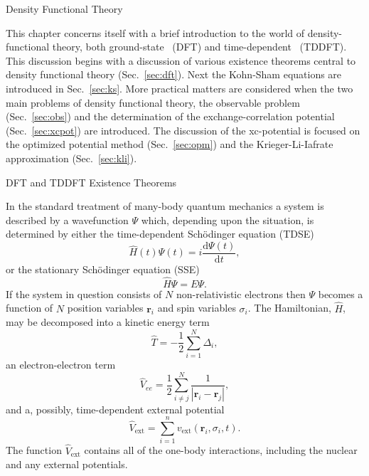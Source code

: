 \documentclass[letterpaper, 11 pt]{report}
\begin{document}
\begin{chapter}{Density Functional Theory \label{chap:dft}}

   This chapter concerns itself with a brief introduction to the world of density-functional theory,
   both ground-state~\cite{dft-engel} (DFT) and time-dependent~\cite{tddft, marques-1} (TDDFT). This
   discussion begins with a discussion of various existence theorems central to density functional
   theory (Sec.~\ref{sec:dft}). Next the Kohn-Sham equations are introduced in Sec.~\ref{sec:ks}.
   More practical matters are considered when the two main problems of density functional theory,
   the observable problem (Sec.~\ref{sec:obs}) and the determination of the exchange-correlation
   potential (Sec.~\ref{sec:xcpot}) are introduced. The discussion of the xc-potential is focused on
   the optimized potential method (Sec.~\ref{sec:opm}) and the Krieger-Li-Iafrate approximation
   (Sec.~\ref{sec:kli}).

   \begin{section}{DFT and TDDFT Existence Theorems \label{sec:dft}}

      In the standard treatment of many-body quantum mechanics a system is described by a wavefunction
      $\Psi$ which, depending upon the situation, is determined by either the time-dependent
      Sch\"{o}dinger equation (TDSE)
      \begin{equation} \label{eq:tdse}
         \hat{H}(t) \Psi(t) = i \frac{\mathrm{d} \Psi(t)}{\mathrm{d} t},
      \end{equation}
      or the stationary Sch\"{o}dinger equation (SSE)
      \begin{equation} \label{eq:sse}
         \hat{H} \Psi = E \Psi.
      \end{equation}
      If the system in question consists of $N$ non-relativistic electrons then $\Psi$ becomes a
      function of $N$ position variables $\mathbf{r}_i$ and spin variables $\sigma_i$. The Hamiltonian,
      $\hat{H}$, may be decomposed into a kinetic energy term
      \begin{equation} \label{eq:Top} %
         \hat{T} = -\frac{1}{2} \sum\limits^{N}_{i=1} \Delta_i,
      \end{equation}
      an electron-electron term
      \begin{equation} \label{eq:Vee} %
         \hat{V}_{ee} = \frac{1}{2} \sum\limits^{N}_{i \neq j}
                        \frac{1}{\left| \mathbf{r}_i - \mathbf{r}_j \right|},
      \end{equation}
      and a, possibly, time-dependent external potential
      \begin{equation} \label{eq:Vext}
         \hat{V}_\mathrm{ext} = \sum\limits^{n}_{i = 1} v_\mathrm{ext} (\mathbf{r}_i, \sigma_i, t).
      \end{equation}
      The function $\hat{V}_\mathrm{ext}$ contains all of the one-body interactions, including the
      nuclear and any external potentials.


\end{section}
\end{chapter}
\end{document}
